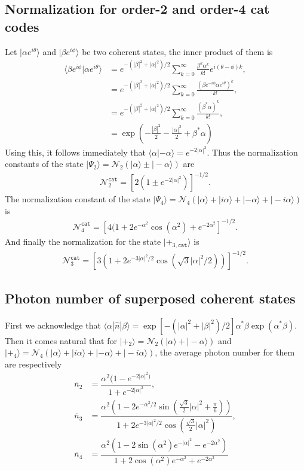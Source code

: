 \documentclass{article}
\begin{document}
\subsection{Normalization for order-2 and order-4 cat codes}
Let $|\alpha e^{i\theta}\rangle$ and $|\beta e^{i\phi}\rangle$ be two coherent states, the inner product of them is
\begin{align}
    \langle \beta e^{i\phi}|\alpha e^{i\theta}\rangle &= e^{-(|\beta|^2+|\alpha|^2)/2}\sum_{k=0}^\infty \frac{\beta^k\alpha^k}{k!}e^{i(\theta-\phi)k},\\
    &=e^{-(|\beta|^2+|\alpha|^2)/2}\sum_{k=0}^\infty \frac{(\beta e^{-i\phi}\alpha e^{i\theta})^k}{k!},\\
    &=e^{-(|\beta|^2+|\alpha|^2)/2}\sum_{k=0}^\infty \frac{(\beta^\ast\alpha)^k}{k!},\\
    &=\exp\left(-\frac{|\beta|^2}{2}-\frac{|\alpha|^2}{2}+\beta^*\alpha\right)
\end{align}
Using this, it follows immediately that $\langle \alpha|-\alpha\rangle = e^{-2|\alpha|^2}$. Thus the normalization constants of the state $|\Psi_2\rangle = \mathcal{N}_2(|\alpha\rangle \pm |-\alpha\rangle)$ are
\begin{align}
    \mathcal{N}^\texttt{cat}_2 = [2(1\pm e^{-2|\alpha|^2})]^{-1/2}.
\end{align}
The normalization constant of the state $|\Psi_4\rangle=\mathcal{N}_4(|\alpha\rangle+|i\alpha\rangle+|-\alpha\rangle+|-i\alpha\rangle)$ is
\begin{align}
    \mathcal{N}^\texttt{cat}_4 = \left[4(1+2e^{-\alpha^2}\cos(\alpha^2)+e^{-2\alpha^2}\right]^{-1/2}.
\end{align}
And finally the normalization for the state $|+_{3,\texttt{cat}}\rangle$ is 
\begin{align}
    \mathcal{N}^\texttt{cat}_3 = \left[3\left(1+2e^{-3|\alpha|^2/2}\cos\left(\sqrt{3}|\alpha|^2/2\right)\right)\right]^{-1/2}.
\end{align}
\subsection{Photon number of superposed coherent states}
First we acknowledge that $\langle \alpha|\hat{n}|\beta\rangle=\exp[-(|\alpha|^2+|\beta|^2)/2]\alpha^*\beta \exp(\alpha^*\beta)$. Then it comes natural that for $|+_2\rangle = \mathcal{N}_2(|\alpha\rangle+|-\alpha\rangle)$ and $|+_4\rangle=\mathcal{N}_4(|\alpha\rangle+|i\alpha\rangle+|-\alpha\rangle+|-i\alpha\rangle)$, the average photon number for them are respectively
\begin{align}
    \bar{n}_2 &= \dfrac{\alpha^2(1-e^{-2|\alpha|^2)}}{1+e^{-2|\alpha|^2}},\\
    \bar{n}_3 &= \dfrac{\alpha^2\left(1-2e^{-\alpha^2/2}\sin\left(\frac{\sqrt{3}}{2}|\alpha|^2+\frac{\pi}{6}\right)\right)}{1+2 e^{-3|\alpha|^2/2}\cos\left(\frac{\sqrt{3}}{2}|\alpha|^2\right)},\\
    \bar{n}_4 &= \dfrac{\alpha^2(1-2\sin(\alpha^2)e^{-|\alpha|^2}-e^{-2\alpha^2})}{1+2\cos(\alpha^2)e^{-\alpha^2}+e^{-2\alpha^2}}
\end{align}
\end{document}
